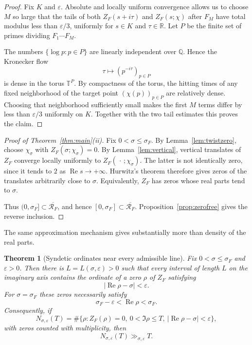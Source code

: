 \documentclass[11pt]{article}
\newtheorem{theorem}{Theorem}[section]
\theoremstyle{remark}
\newcommand{\T}{\mathbb T}
\newcommand{\ZF}{Z_F}
\newcommand{\Ree}{\operatorname{Re}}
\begin{document}
\begin{proof}
Fix $K$ and $\varepsilon$.  Absolute and locally uniform convergence allows us to choose $M$ so large that the tails of both $\ZF(s+i\tau)$ and $\ZF(s;\chi)$ after $F_M$ have total modulus less than $\varepsilon/3$, uniformly for $s\in K$ and $\tau\in\mathbb R$.  Let $P$ be the finite set of primes dividing $F_1\cdots F_M$.

The numbers $\{\log p:p\in P\}$ are linearly independent over $\mathbb Q$.  Hence the Kronecker flow
\[
\tau\longmapsto (p^{-i\tau})_{p\in P}
\]
is dense in the torus $\T^P$.  By compactness of the torus, the hitting times of any fixed neighborhood of the target point $(\chi(p))_{p\in P}$ are relatively dense.  Choosing that neighborhood sufficiently small makes the first $M$ terms differ by less than $\varepsilon/3$ uniformly on $K$.  Together with the two tail estimates this proves the claim.
\end{proof}

\begin{proof}[Proof of Theorem~\ref{thm:main}\textup{(ii)}]
Fix $0<\sigma\le\sigma_F$.  By Lemma~\ref{lem:twistzero}, choose $\chi_\sigma$ with $\ZF(\sigma;\chi_\sigma)=0$.  By Lemma~\ref{lem:vertical}, vertical translates of $\ZF$ converge locally uniformly to $\ZF(\,\cdot\,;\chi_\sigma)$.  The latter is not identically zero, since it tends to $2$ as $\Ree s\to+\infty$.  Hurwitz's theorem therefore gives zeros of the translates arbitrarily close to $\sigma$.  Equivalently, $\ZF$ has zeros whose real parts tend to $\sigma$.

Thus $(0,\sigma_F]\subset\overline{\mathcal R_F}$, and hence $[0,\sigma_F]\subset\overline{\mathcal R_F}$.  Proposition~\ref{prop:zerofree} gives the reverse inclusion.
\end{proof}

The same approximation mechanism gives substantially more than density of the real parts.

\begin{theorem}[Syndetic ordinates near every admissible line]\label{thm:syndetic}
Fix $0<\sigma\le\sigma_F$ and $\varepsilon>0$.  Then there is $L=L(\sigma,\varepsilon)>0$ such that every interval of length $L$ on the imaginary axis contains the ordinate of a zero $\rho$ of $\ZF$ satisfying
\[
|\Ree\rho-\sigma|<\varepsilon.
\]
For $\sigma=\sigma_F$ these zeros necessarily satisfy
\[
\sigma_F-\varepsilon<\Ree\rho<\sigma_F.
\]
Consequently, if
\[
N_{\sigma,\varepsilon}(T)
=\#\{\rho:\ZF(\rho)=0,\ 0<\Im\rho\le T,\ |\Ree\rho-\sigma|<\varepsilon\},
\]
with zeros counted with multiplicity, then
\[
N_{\sigma,\varepsilon}(T)\gg_{\sigma,\varepsilon} T.
\]
\end{theorem}
\end{document}
